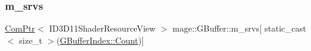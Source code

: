 \hypertarget{structmage_1_1_g_buffer_aec49b46758c36b8963a53e709a89bb0e}{}\label{structmage_1_1_g_buffer_aec49b46758c36b8963a53e709a89bb0e} 
\subsubsection{\texorpdfstring{m\+\_\+srvs}{m\_srvs}}
{\footnotesize\ttfamily \hyperlink{namespacemage_ae74f374780900893caa5555d1031fd79}{Com\+Ptr}$<$ I\+D3\+D11\+Shader\+Resource\+View $>$ mage\+::\+G\+Buffer\+::m\+\_\+srvs\mbox{[} static\+\_\+cast$<$ size\+\_\+t $>$(\hyperlink{structmage_1_1_g_buffer_a72f0fc0f46052fdc9872c48c57894607ae93f994f01c537c4e2f7d8528c3eb5e9}{G\+Buffer\+Index\+::\+Count})\mbox{]}\hspace{0.3cm}{\ttfamily [private]}}

